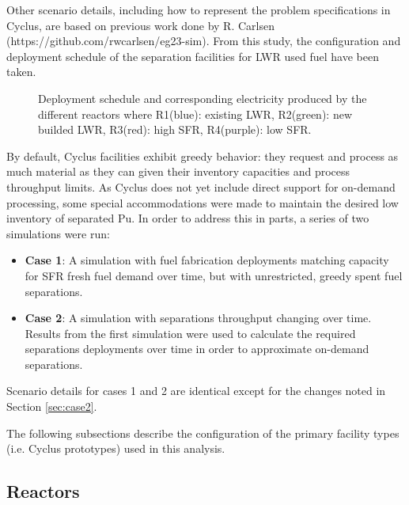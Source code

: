 \documentclass[12pt]{article}
\begin{document}
Other scenario details, including how to represent the problem specifications in Cyclus,
are based on previous work done by R. Carlsen
(https://github.com/rwcarlsen/eg23-sim).  From this study, the configuration
and deployment schedule of the separation facilities for LWR used fuel have
been taken.

\begin{figure}[h!]
    \centering
    \caption{
        Deployment schedule and corresponding electricity produced by the
        different reactors where R1(blue): existing LWR, R2(green): new
        builded LWR, R3(red): high SFR, R4(purple): low
        SFR.\label{fig:deployment}
    }
\end{figure}

By default, Cyclus facilities exhibit greedy behavior: they request and
process as much material as they can given their inventory capacities and
process throughput limits. As Cyclus does not yet include direct support for on-demand
processing, some special accommodations were made to maintain the desired low
inventory of separated Pu. In order to address this in parts, a series of two
simulations were run:

\begin{itemize}

    \item \textbf{Case 1}: A simulation with fuel fabrication deployments
        matching capacity for SFR fresh fuel demand over time, but with
        unrestricted, greedy spent fuel separations.

    \item \textbf{Case 2}: A simulation with separations throughput changing
        over time. Results from the first simulation were used to calculate
        the required separations deployments over time in order to approximate
        on-demand separations.

\end{itemize}

Scenario details for cases 1 and 2 are identical except for the changes noted in
Section \ref{sec:case2}.

The following subsections describe the configuration of the primary facility
types (i.e. Cyclus prototypes) used in this analysis.

\subsection{Reactors}
\end{document}
